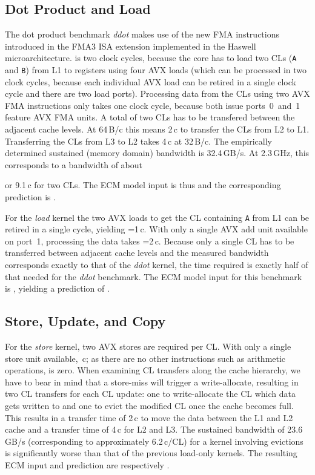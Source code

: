 \documentclass{llncs}
\newcommand{\ecm}[6]{\mbox{}}
\newcommand{\ecmp}[5]{\mbox{}}
\begin{document}
\subsection{Dot Product and Load}
The dot product benchmark \textit{ddot} makes use of the new \ac{FMA}
instructions introduced in the FMA3 ISA extension implemented in the
Haswell microarchitecture.   is two clock cycles, because the
core has to load two CLs (\texttt{A} and \texttt{B}) from L1 to registers using
four AVX loads (which can be processed in two clock cycles, because each
individual AVX load can be retired in a single clock cycle and there are two
load ports). Processing data from the CLs using two AVX \ac{FMA} instructions
only takes one clock cycle, because both issue ports~0~and~1 feature AVX FMA
units. A total of two CLs has to be transfered between the adjacent cache
levels. At 64\,B/c this means 2\,c to transfer the CLs from L2 to L1.
Transferring the CLs from L3 to L2 takes 4\,c at 32\,B/c. The empirically
determined sustained (memory domain) bandwidth is 32.4\,GB/s. At 2.3\,GHz, this
corresponds to a bandwidth of about

or 9.1\,c for two CLs. The
ECM model input is thus \ecm{1}{2}{2}{4}{9.1}{\mathrm{c}} and the
corresponding prediction is \ecmp{2}{4}{8}{17.1}{\mathrm{c}}.

For the \textit{load} kernel the two AVX loads to get the CL containing
\texttt{A} from L1 can be retired in a single cycle, yielding
=1\,c. With only a single AVX add unit available on port~1,
processing the data takes =2\,c.  Because only a single CL has
to be transferred between adjacent cache levels and the measured bandwidth
corresponds exactly to that of the \textit{ddot} kernel, the time required is
exactly half of that needed for the \textit{ddot} benchmark.  The ECM model
input for this benchmark is \ecm{2}{1}{1}{2}{4.5}{\mathrm{c}}, yielding a
prediction of \ecmp{2}{2}{4}{8.5}{\mathrm{c}}.

\subsection{Store, Update, and Copy}

For the \textit{store} kernel, two AVX stores are required per CL. With only a
single store unit available, \,c; as there are no other
instructions such as arithmetic operations,  is zero. When
examining CL transfers along the cache hierarchy, we have to bear in mind that
a store-miss will trigger a write-allocate, resulting in two CL transfers for
each CL update: one to write-allocate the CL which data gets written to and one
to evict the modified CL once the cache becomes full.  This results in a
transfer time of 2\,c to move the data between the L1 and L2 cache and a
transfer time of 4\,c for L2 and L3. The sustained bandwidth of 23.6\,GB/s
(corresponding to approximately 6.2\,c/CL) for a kernel involving evictions is
significantly worse than that of the previous load-only kernels. The resulting
ECM input and prediction are \ecm{0}{2}{2}{4}{12.5}{\mathrm{c}} respectively
\ecmp{2}{4}{8}{20.5}{\mathrm{c}}.
\end{document}
